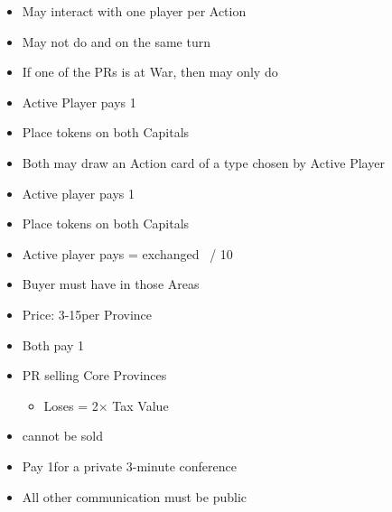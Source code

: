 \documentclass[10pt]{article}
\begin{document}
\begin{itemize}
	\item May interact with one player per Action
	\item May not do  and  on the same turn
	\item If one of the PRs is at War, then may only do 
\end{itemize}
\begin{itemize}
	\item Active Player pays 1\diplopower
	\item Place \marriage tokens on both Capitals
	\item Both may draw an Action card of a type chosen by Active Player
\end{itemize}
\begin{itemize}
	\item Active player pays 1\diplopower
	\item Place \alliance tokens on both Capitals
\end{itemize}
\begin{itemize}
	\item Active player pays \diplopower = exchanged \ducats~/ 10
\end{itemize}
\begin{itemize}
	\item Buyer must have \claim in those Areas
	\item Price: 3-15\ducats per Province
	\item Both pay 1\adminpower
	\item PR selling Core Provinces
	\begin{itemize}
		\item Loses \prestige = 2× Tax Value
	\end{itemize}
	\item \vassals cannot be sold
\end{itemize}
\begin{itemize}
	\item Pay 1\diplopower for a private 3-minute conference
	\item All other communication must be public
\end{itemize}
\end{document}

